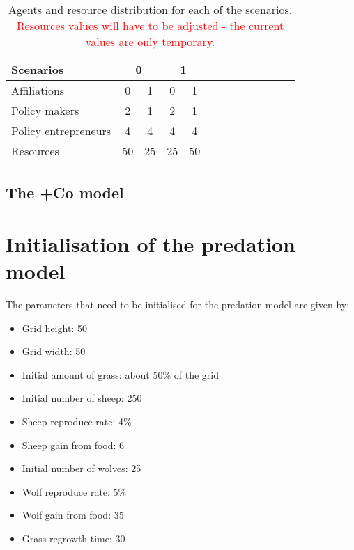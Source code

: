 \documentclass[12pt]{article}
\begin{document}
\begin{table}[h!]
\begin{center}
\begin{tabular}{ |l|c|c|c|c|c|c|c|c|c|c|c|c| } 
\hline
 {\bfseries Scenarios}
 				& \multicolumn{2}{|c|}{ {\bfseries 0}}	
					& \multicolumn{2}{|c|}{ {\bfseries 1}}	
								\\ \hline \hline
Affiliations			& 0	& 1	&  0	& 1	\\ \hline
Policy makers 		& 2	& 1	& 2	& 1	\\ \hline
Policy entrepreneurs	& 4	& 4	& 4	& 4	\\ \hline
Resources		& 50	& 25	& 25	& 50	\\ \hline
\end{tabular}
\end{center}
\caption{Agents and resource distribution for each of the scenarios. \textcolor{red}{Resources values will have to be adjusted - the current values are only temporary.}}
\label{tab:agentResourceDistribution}
\end{table}

\subsection{The +Co model}


\section{Initialisation of the predation model}
\label{sec:predation_initialisation}

The parameters that need to be initialised for the predation model are given by:

\begin{itemize}
\item Grid height: 50
\item Grid width: 50
\item Initial amount of grass: about 50\% of the grid
\item Initial number of sheep: 250
\item Sheep reproduce rate: 4\%
\item Sheep gain from food: 6
\item Initial number of wolves: 25
\item Wolf reproduce rate: 5\%
\item Wolf gain from food: 35
\item Grass regrowth time: 30
\end{itemize}
\end{document}
